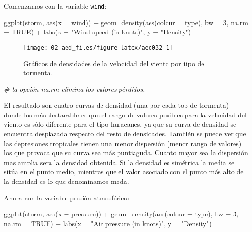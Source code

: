 \documentclass[
]{book}
\newenvironment{Shaded}{\begin{snugshade}}{\end{snugshade}}
\newcommand{\AttributeTok}[1]{\textcolor[rgb]{0.77,0.63,0.00}{#1}}
\newcommand{\CommentTok}[1]{\textcolor[rgb]{0.56,0.35,0.01}{\textit{#1}}}
\newcommand{\ConstantTok}[1]{\textcolor[rgb]{0.00,0.00,0.00}{#1}}
\newcommand{\DecValTok}[1]{\textcolor[rgb]{0.00,0.00,0.81}{#1}}
\newcommand{\FunctionTok}[1]{\textcolor[rgb]{0.00,0.00,0.00}{#1}}
\newcommand{\NormalTok}[1]{#1}
\newcommand{\SpecialCharTok}[1]{\textcolor[rgb]{0.00,0.00,0.00}{#1}}
\newcommand{\StringTok}[1]{\textcolor[rgb]{0.31,0.60,0.02}{#1}}
\begin{document}
Comenzamos con la variable \texttt{wind}:

\begin{Shaded}
\begin{Highlighting}[]
\FunctionTok{ggplot}\NormalTok{(storm, }\FunctionTok{aes}\NormalTok{(}\AttributeTok{x =}\NormalTok{ wind)) }\SpecialCharTok{+} 
  \FunctionTok{geom\_density}\NormalTok{(}\FunctionTok{aes}\NormalTok{(}\AttributeTok{colour =}\NormalTok{ type), }\AttributeTok{bw =} \DecValTok{3}\NormalTok{, }\AttributeTok{na.rm =} \ConstantTok{TRUE}\NormalTok{) }\SpecialCharTok{+} 
  \FunctionTok{labs}\NormalTok{(}\AttributeTok{x =} \StringTok{"Wind speed (in knots)"}\NormalTok{, }\AttributeTok{y =} \StringTok{"Density"}\NormalTok{) }
\end{Highlighting}
\end{Shaded}

\begin{figure}

{\centering \texttt{[image: 02-aed\_files/figure-latex/aed032-1]} 

}

\caption{Gráficos de densidades de la velocidad del viento por tipo de tormenta.}\label{fig:aed032}
\end{figure}

\begin{Shaded}
\begin{Highlighting}[]
\CommentTok{\# la opción na.rm elimina los valores pérdidos.}
\end{Highlighting}
\end{Shaded}

El resultado son cuatro curvas de densidad (una por cada top de tormenta) donde los más destacable es que el rango de valores posibles para la velocidad del viento es sólo diferente para el tipo huracanes, ya que su curva de densidad se encuentra desplazada respecto del resto de densidades. También se puede ver que las depresiones tropicales tienen una menor dispersión (menor rango de valores) los que provoca que su curva sea más puntiaguda. Cuanto mayor sea la dispersión mas amplia sera la densidad obtenida. Si la densidad es simétrica la media se sitúa en el punto medio, mientras que el valor asociado con el punto más alto de la densidad es lo que denominamos moda.

Ahora con la variable presión atmosférica:

\begin{Shaded}
\begin{Highlighting}[]
\FunctionTok{ggplot}\NormalTok{(storm, }\FunctionTok{aes}\NormalTok{(}\AttributeTok{x =}\NormalTok{ pressure)) }\SpecialCharTok{+} 
  \FunctionTok{geom\_density}\NormalTok{(}\FunctionTok{aes}\NormalTok{(}\AttributeTok{colour =}\NormalTok{ type), }\AttributeTok{bw =} \DecValTok{3}\NormalTok{, }\AttributeTok{na.rm =} \ConstantTok{TRUE}\NormalTok{) }\SpecialCharTok{+} 
  \FunctionTok{labs}\NormalTok{(}\AttributeTok{x =} \StringTok{"Air pressure (in knots)"}\NormalTok{, }\AttributeTok{y =} \StringTok{"Density"}\NormalTok{) }
\end{Highlighting}
\end{Shaded}
\end{document}
